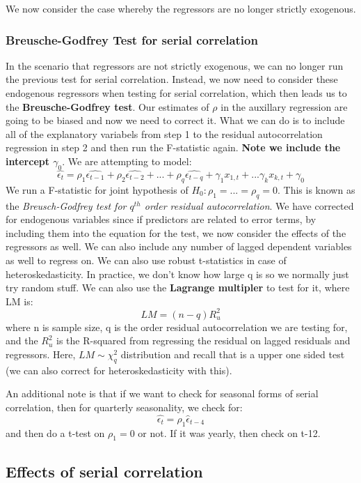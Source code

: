 \documentclass[11pt, oneside]{article}
\theoremstyle{definition}
\begin{document}
We now consider the case whereby the regressors are no longer strictly exogenous.

\subsubsection{Breusche-Godfrey Test for serial correlation}
In the scenario that regressors are not strictly exogenous, we can no longer run the previous test for serial correlation. Instead, we now need to consider these endogenous regressors when testing for serial correlation, which then leads us to the \textbf{Breusche-Godfrey test}. Our estimates of $\rho$ in the auxillary regression are going to be biased and now we need to correct it. What we can do is to include all of the explanatory variabels from step 1 to the residual autocorrelation regression in step 2 and then run the F-statistic again. \textbf{Note we include the intercept $\gamma_0$}.
We are attempting to model:
$$
\hat{\epsilon_t} = \rho_1 \hat{\epsilon_{t-1}} + \rho_2 \hat{\epsilon_{t-2}} + ... + \rho_q \hat{\epsilon_{t-q}} + \gamma_1 x_{1,t} + ... \gamma_k x_{k,t} + \gamma_0
$$
We run a F-statistic for joint hypothesis of $H_0: \rho_1=...=\rho_q = 0$. This is known as the \textit{Breusch-Godfrey test for $q^{th}$ order residual autocorrelation}. We have corrected for endogenous variables since if predictors are related to error terms, by including them into the equation for the test, we now consider the effects of the regressors as well. We can also include any number of lagged dependent variables as well to regress on. We can also use robust t-statistics in case of heteroskedasticity. In practice, we don't know how large q is so we normally just try random stuff. We can also use the \textbf{Lagrange multipler} to test for it, where LM is:
$$
LM = (n-q)R_u^2
$$
where n is sample size, q is the order residual autocorrelation we are testing for, and the $R_u^2$ is the R-squared from regressing the residual on lagged residuals and regressors. Here, $LM \sim \chi_q^2$ distribution and recall that is a upper one sided test (we can also correct for heteroskedasticity with this).

An additional note is that if we want to check for seasonal forms of serial correlation, then for quarterly seasonality, we check for:
$$
\hat{\epsilon_t} = \rho_1\hat{\epsilon}_{t-4}
$$
and then do a t-test on $\rho_1 = 0$ or not. If it was yearly, then check on t-12.

\subsection{Effects of serial correlation}
\end{document}
